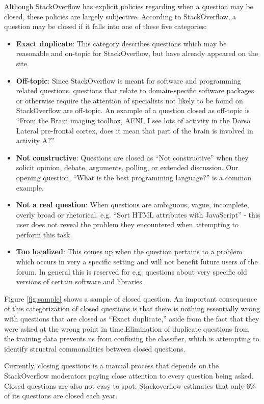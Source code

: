 \documentclass[11pt]{article}
\begin{document}
\noindent Although StackOverflow has explicit policies regarding when
a question may be closed, these policies are largely
subjective. According to StackOverflow, a question may be closed if it
falls into one of these five categories:

\begin{itemize}
\item \textbf{Exact duplicate}: This category describes questions which may be reasonable and on-topic for StackOverflow, but have already appeared on the site.
\item \textbf{Off-topic}: Since StackOverflow is meant for software and programming related questions, questions that relate to domain-specific software packages or otherwise require the attention of specialists not likely to be found on StackOverflow are off-topic. An example of a question closed as off-topic is ``From the Brain imaging toolbox, AFNI, I see lots of activity in the Dorso Lateral pre-frontal cortex, does it mean that part of the brain is involved in activity A?''
\item \textbf{Not constructive}: Questions are closed as ``Not constructive'' when they solicit opinion, debate, arguments, polling, or extended discussion. Our opening question, ``What is the best programming language?'' is a common example.
\item \textbf{Not a real question}: When questions are ambiguous, vague, incomplete, overly broad or rhetorical. e.g. ``Sort HTML attributes with JavaScript'' - this user does not reveal the problem they encountered when attempting to perform this task.
\item \textbf{Too localized}: This comes up when the question pertains to a problem which occurs in very a specific setting and will not benefit future users of the forum. In general this is reserved for e.g. questions about very specific old versions of certain software and libraries.
\end{itemize}

\noindent Figure \ref{fig:sample} shows a sample of closed question. An important consequence of this categorization of closed questions is that there is nothing essentially wrong with questions that are closed as ``Exact duplicate,'' aside from the fact that they were asked at the wrong point in time.Elimination of duplicate questions from the training data prevents us from confusing the classifier, which is attempting to identify structral commonalities between closed questions.

\noindent Currently, closing questions is a manual process that
depends on the StackOverflow moderators paying close attention to every
question being asked. Closed questions are also not easy to spot:
Stackoverflow estimates that only 6\% of its questions are closed each
year.
\end{document}
